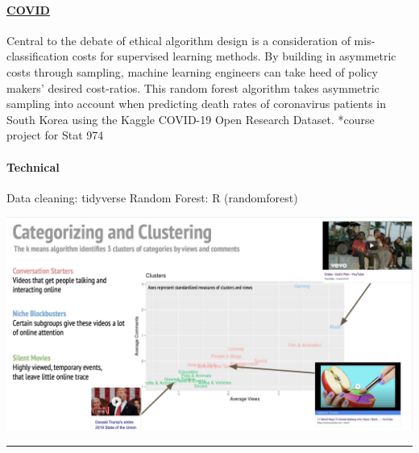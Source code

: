 \documentclass[
]{article}
\begin{document}
\begin{row}

\begin{col-sm-6}

\hypertarget{covid}{%
\paragraph{\texorpdfstring{\href{https://katjanewilson.github.io/WhartonAnalytics-MLB/}{COVID}}{COVID}}\label{covid}}

Central to the debate of ethical algorithm design is a consideration of
mis-classification costs for supervised learning methods. By building in
asymmetric costs through sampling, machine learning engineers can take
heed of policy makers' desired cost-ratios. This random forest algorithm
takes asymmetric sampling into account when predicting death rates of
coronavirus patients in South Korea using the Kaggle COVID-19 Open
Research Dataset. *course project for Stat 974

\hypertarget{technical-2}{%
\paragraph{Technical}\label{technical-2}}

Data cleaning: tidyverse Random Forest: R (randomforest)

\end{col-sm-6}

\begin{col-sm-6}

\includegraphics[width=800px]{images/image2}

\end{col-sm-6}

\end{row}

\begin{center}\rule{0.5\linewidth}{0.5pt}\end{center}
\end{document}
